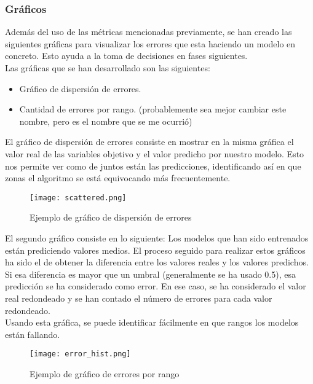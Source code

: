 \subsubsection{Gráficos}
Además del uso de las métricas mencionadas previamente, se han creado las siguientes gráficas para visualizar los errores que esta haciendo un modelo en concreto. Esto ayuda a la toma de decisiones en fases siguientes.\\
Las gráficas que se han desarrollado son las siguientes:
\begin{itemize}
	\item Gráfico de dispersión de errores.
	\item Cantidad de errores por rango. (probablemente sea mejor cambiar este nombre, pero es el nombre que se me ocurrió)
\end{itemize}
El gráfico de dispersión de errores consiste en mostrar en la misma gráfica el valor real de las variables objetivo y el valor predicho por nuestro modelo. Esto nos permite ver como de juntos están las predicciones, identificando así en que zonas el algoritmo se está equivocando más frecuentemente.\\
 \begin{figure}[!htbp]
	\centering
	\texttt{[image: scattered.png]}
	\caption{Ejemplo de gráfico de dispersión de errores}
	\label{fig:scattered_example}
\end{figure}
\linebreak
El segundo gráfico consiste en lo siguiente:
Los modelos que han sido entrenados están prediciendo valores medios. El proceso seguido para realizar estos gráficos ha sido el de obtener la diferencia entre los valores reales y los valores predichos. Si esa diferencia es mayor que un umbral (generalmente se ha usado 0.5), esa predicción se ha considerado como error. En ese caso, se ha considerado el valor real redondeado y se han contado el número de errores para cada valor redondeado.\\
Usando esta gráfica, se puede identificar fácilmente en que rangos los modelos están fallando.\\
\linebreak
 \begin{figure}[!htbp]
	\centering
	\texttt{[image: error\_hist.png]}
	\caption{Ejemplo de gráfico de errores por rango}
	\label{fig:error_hist_example}
\end{figure}
\\
\pagebreak
